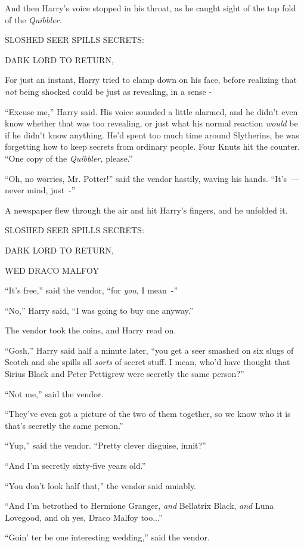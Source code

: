 And then Harry's voice stopped in his throat, as he caught sight of the top fold of the \emph{Quibbler.}

SLOSHED SEER SPILLS SECRETS:

DARK LORD TO RETURN,

For just an instant, Harry tried to clamp down on his face, before realizing that \emph{not} being shocked could be just as revealing, in a sense -

``Excuse me,'' Harry said. His voice sounded a little alarmed, and he didn't even know whether that was too revealing, or just what his normal reaction \emph{would} be if he didn't know anything. He'd spent too much time around Slytherins, he was forgetting how to keep secrets from ordinary people. Four Knuts hit the counter. ``One copy of the \emph{Quibbler,} please.''

``Oh, no worries, Mr. Potter!'' said the vendor hastily, waving his hands. ``It's~--- never mind, just~-''

A newspaper flew through the air and hit Harry's fingers, and he unfolded it.

SLOSHED SEER SPILLS SECRETS:

DARK LORD TO RETURN,

WED DRACO MALFOY

``It's free,'' said the vendor, ``for \emph{you}, I mean~-''

``No,'' Harry said, ``I was going to buy one anyway.''

The vendor took the coins, and Harry read on.

``Gosh,'' Harry said half a minute later, ``you get a seer smashed on six slugs of Scotch and she spills all \emph{sorts} of secret stuff. I mean, who'd have thought that Sirius Black and Peter Pettigrew were secretly the same person?''

``Not me,'' said the vendor.

``They've even got a picture of the two of them together, so we know who it is that's secretly the same person.''

``Yup,'' said the vendor. ``Pretty clever disguise, innit?''

``And I'm secretly sixty-five years old.''

``You don't look half that,'' the vendor said amiably.

``And I'm betrothed to Hermione Granger, \emph{and} Bellatrix Black, \emph{and} Luna Lovegood, and oh yes, Draco Malfoy too...''

``Goin' ter be one interesting wedding,'' said the vendor.

